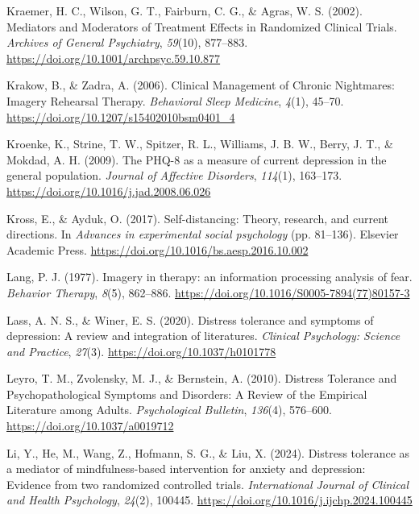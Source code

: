 \documentclass[
  man,floatsintext]{apa7}
\newlength{\cslhangindent}
\newlength{\cslentryspacingunit} %
\newenvironment{CSLReferences}[2] %
 {%
  \setlength{\parindent}{0pt}
  \ifodd #1
  \let\oldpar\par
  \def\par{\hangindent=\cslhangindent\oldpar}
  \fi
  \setlength{\parskip}{#2\cslentryspacingunit}
 }%
 {}
\begin{document}
\begin{CSLReferences}{1}{0}
\leavevmode{}%
Kraemer, H. C., Wilson, G. T., Fairburn, C. G., \& Agras, W. S. (2002). Mediators and Moderators of Treatment Effects in Randomized Clinical Trials. \emph{Archives of General Psychiatry}, \emph{59}(10), 877--883. \url{https://doi.org/10.1001/archpsyc.59.10.877}

\leavevmode{}%
Krakow, B., \& Zadra, A. (2006). Clinical Management of Chronic Nightmares: Imagery Rehearsal Therapy. \emph{Behavioral Sleep Medicine}, \emph{4}(1), 45--70. \url{https://doi.org/10.1207/s15402010bsm0401_4}

\leavevmode{}%
Kroenke, K., Strine, T. W., Spitzer, R. L., Williams, J. B. W., Berry, J. T., \& Mokdad, A. H. (2009). The PHQ-8 as a measure of current depression in the general population. \emph{Journal of Affective Disorders}, \emph{114}(1), 163--173. \url{https://doi.org/10.1016/j.jad.2008.06.026}

\leavevmode{}%
Kross, E., \& Ayduk, O. (2017). Self-distancing: Theory, research, and current directions. In \emph{Advances in experimental social psychology} (pp. 81--136). Elsevier Academic Press. \url{https://doi.org/10.1016/bs.aesp.2016.10.002}

\leavevmode{}%
Lang, P. J. (1977). Imagery in therapy: an information processing analysis of fear. \emph{Behavior Therapy}, \emph{8}(5), 862--886. \url{https://doi.org/10.1016/S0005-7894(77)80157-3}

\leavevmode{}%
Lass, A. N. S., \& Winer, E. S. (2020). Distress tolerance and symptoms of depression: A review and integration of literatures. \emph{Clinical Psychology: Science and Practice}, \emph{27}(3). \url{https://doi.org/10.1037/h0101778}

\leavevmode{}%
Leyro, T. M., Zvolensky, M. J., \& Bernstein, A. (2010). Distress Tolerance and Psychopathological Symptoms and Disorders: A Review of the Empirical Literature among Adults. \emph{Psychological Bulletin}, \emph{136}(4), 576--600. \url{https://doi.org/10.1037/a0019712}

\leavevmode{}%
Li, Y., He, M., Wang, Z., Hofmann, S. G., \& Liu, X. (2024). Distress tolerance as a mediator of mindfulness-based intervention for anxiety and depression: Evidence from two randomized controlled trials. \emph{International Journal of Clinical and Health Psychology}, \emph{24}(2), 100445. \url{https://doi.org/10.1016/j.ijchp.2024.100445}


\end{CSLReferences}
\end{document}
